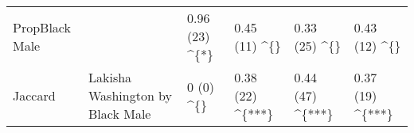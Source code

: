 \begin{table}
\begin{tabular}{llllll}
PropBlack Male &  & 0.96 (23) \textasciicircum{}\{*\} & 0.45 (11) \textasciicircum{}\{\} & 0.33 (25) \textasciicircum{}\{\} & 0.43 (12) \textasciicircum{}\{\}\\

Jaccard & \multirow{-3}{*}{\raggedright\arraybackslash Lakisha Washington by Black Male} & 0 (0) \textasciicircum{}\{\} & 0.38 (22) \textasciicircum{}\{***\} & 0.44 (47) \textasciicircum{}\{***\} & 0.37 (19) \textasciicircum{}\{***\}\\
\bottomrule
\end{tabular}
\endgroup{}
\end{table}
